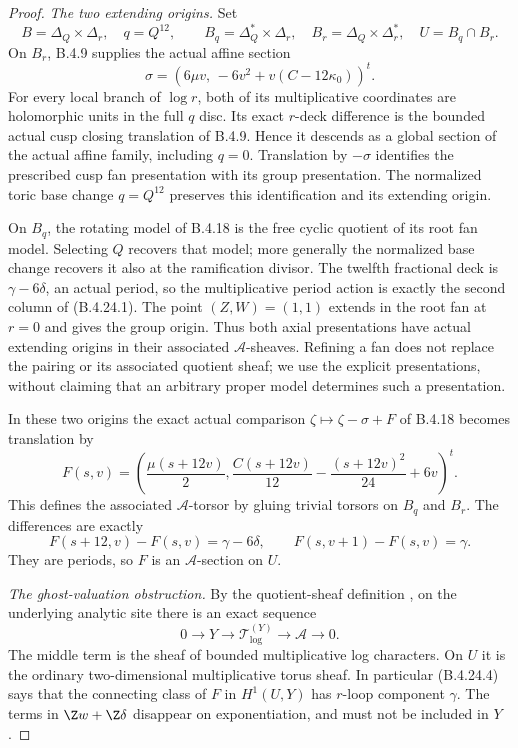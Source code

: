 \begin{proof}
\emph{The two extending origins.}
Set
\[
 B=\Delta_Q\times\Delta_r,\quad q=Q^{12},\qquad
 B_q=\Delta_Q^*\times\Delta_r,\quad
 B_r=\Delta_Q\times\Delta_r^*,\quad U=B_q\cap B_r.
\]
On $B_r$, B.4.9 supplies the actual affine section
\[
 \sigma=
 \left(6\mu v,\,-6v^2+v(C-12\kappa_0)\right)^t.
 \tag{B.4.24.2}
\]
For every local branch of $\log r$, both of its
multiplicative coordinates are holomorphic units
in the full $q$ disc. Its exact $r$-deck difference
is the bounded actual cusp closing translation
of B.4.9. Hence it descends as a global section
of the actual affine family, including $q=0$.
Translation by $-\sigma$ identifies the prescribed
cusp fan presentation with its group presentation.
The normalized toric base change $q=Q^{12}$ preserves
this identification and its extending origin.

On $B_q$, the rotating model of B.4.18 is the
free cyclic quotient of its root fan model. Selecting
$Q$ recovers that model; more generally the normalized
base change recovers it also at the ramification
divisor. The twelfth fractional deck is
$\gamma-6\delta$, an actual period, so the
multiplicative period action is exactly the second
column of (B.4.24.1). The point $(Z,W)=(1,1)$
extends in the root fan at $r=0$ and gives the
group origin. Thus both axial presentations have
actual extending origins in their associated
$\mathcal A$-sheaves. Refining a fan does not
replace the pairing or its associated quotient
sheaf; we use the explicit presentations, without
claiming that an arbitrary proper model determines
such a presentation.

In these two origins the exact actual comparison
$\zeta\mapsto\zeta-\sigma+F$ of B.4.18 becomes
translation by
\[
 F(s,v)=\left(
 \frac{\mu(s+12v)}2,
 \frac{C(s+12v)}{12}-\frac{(s+12v)^2}{24}+6v
 \right)^t.
 \tag{B.4.24.3}
\]
This defines the associated $\mathcal A$-torsor
by gluing trivial torsors on $B_q$ and $B_r$.
The differences are exactly
\[
 F(s+12,v)-F(s,v)=\gamma-6\delta,
 \qquad F(s,v+1)-F(s,v)=\gamma.
 \tag{B.4.24.4}
\]
They are periods, so $F$ is an $\mathcal A$-section
on $U$.

\emph{The ghost-valuation obstruction.}
By the quotient-sheaf definition
\citep[Sections 1.3.1--1.3.4, pp.~81--82]{KKN2008Root},
on the underlying analytic site there is an exact sequence
\[
 0\longrightarrow Y\longrightarrow
 \mathcal T_{\log}^{(Y)}\longrightarrow
 \mathcal A\longrightarrow0.
 \tag{B.4.24.5}
\]
The middle term is the sheaf of bounded multiplicative
log characters. On $U$ it is the ordinary
two-dimensional multiplicative torus sheaf.
In particular (B.4.24.4) says that the connecting
class of $F$ in $H^1(U,Y)$ has $r$-loop component
$\gamma$. The terms in $\Z w+\Z\delta$ disappear
on exponentiation, and must not be included in $Y$.


\end{proof}
